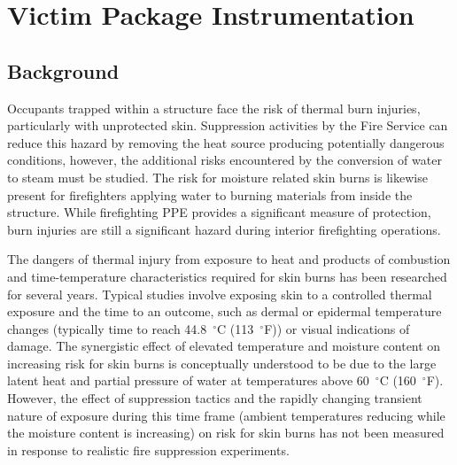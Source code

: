 \documentclass[12pt,oneside]{book}
\begin{document}
\clearpage

\section{Victim Package Instrumentation}

\subsection{Background}
Occupants trapped within a structure face the risk of thermal burn injuries, particularly with unprotected skin.  Suppression activities by the Fire Service can reduce this hazard by removing the heat source producing potentially dangerous conditions, however, the additional risks encountered by the conversion of water to steam must be studied.  The risk for moisture related skin burns is likewise present for firefighters applying water to burning materials from inside the structure.  While firefighting PPE provides a significant measure of protection, burn injuries are still a significant hazard during interior firefighting operations.

The dangers of thermal injury from exposure to heat and products of combustion and time-temperature characteristics required for skin burns has been researched for several years.  Typical studies involve exposing skin to a controlled thermal exposure and the time to an outcome, such as dermal or epidermal temperature changes (typically time to reach 44.8~$^\circ$C (113~$^\circ$F)) or visual indications of damage. The synergistic effect of elevated temperature and moisture content on increasing risk for skin burns is conceptually understood to be due to the large latent heat and partial pressure of water at temperatures above 60~$^\circ$C (160~$^\circ$F).  However, the effect of suppression tactics and the rapidly changing transient nature of exposure during this time frame (ambient temperatures reducing while the moisture content is increasing) on risk for skin burns has not been measured in response to realistic fire suppression experiments. 
\end{document}
